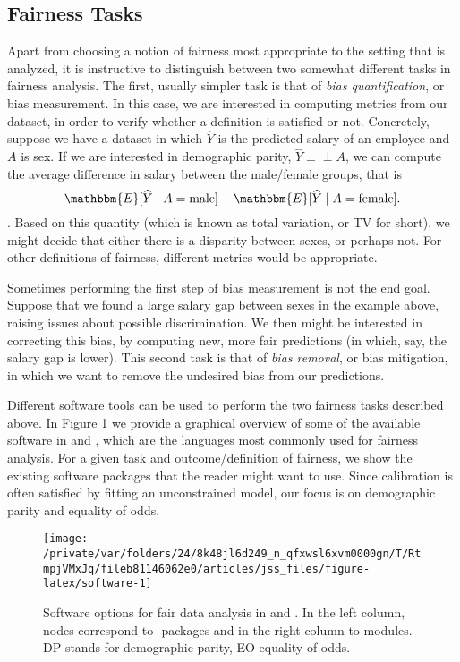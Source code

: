 \documentclass[
  nojss]{jss}
\begin{document}
\hypertarget{fairness-tasks}{%
\subsection{Fairness Tasks}\label{fairness-tasks}}

Apart from choosing a notion of fairness most appropriate to the setting
that is analyzed, it is instructive to distinguish between two somewhat
different tasks in fairness analysis. The first, usually simpler task is
that of \emph{bias quantification}, or bias measurement. In this case,
we are interested in computing metrics from our dataset, in order to
verify whether a definition is satisfied or not. Concretely, suppose we
have a dataset in which \(\widehat{Y}\) is the predicted salary of an
employee and \(A\) is sex. If we are interested in demographic parity,
\(\widehat{Y} {\perp\!\!\!\perp}A\), we can compute the average
difference in salary between the male/female groups, that is
\[\mathbbm{E}[\widehat{Y} \mid A = \text{male}] - \mathbbm{E}[\widehat{Y} \mid A = \text{female}].\].
Based on this quantity (which is known as total variation, or TV for
short), we might decide that either there is a disparity between sexes,
or perhaps not. For other definitions of fairness, different metrics
would be appropriate.

Sometimes performing the first step of bias measurement is not the end
goal. Suppose that we found a large salary gap between sexes in the
example above, raising issues about possible discrimination. We then
might be interested in correcting this bias, by computing new, more fair
predictions (in which, say, the salary gap is lower). This second task
is that of \emph{bias removal}, or bias mitigation, in which we want to
remove the undesired bias from our predictions.

Different software tools can be used to perform the two fairness tasks
described above. In Figure \ref{fig:software} we provide a graphical
overview of some of the available software in  and
, which are the languages most commonly used for fairness
analysis. For a given task and outcome/definition of fairness, we show
the existing software packages that the reader might want to use. Since
calibration is often satisfied by fitting an unconstrained model, our
focus is on demographic parity and equality of odds.

\begin{CodeChunk}
\begin{figure}

{\centering \texttt{[image: /private/var/folders/24/8k48jl6d249\_n\_qfxwsl6xvm0000gn/T/RtmpjVMxJq/fileb81146062e0/articles/jss\_files/figure-latex/software-1]} 

}

\caption{Software options for fair data analysis in  and . In the left column, nodes correspond to -packages and in the right column to  modules. DP stands for demographic parity, EO equality of odds.}\label{fig:software}
\end{figure}
\end{CodeChunk}
\end{document}
